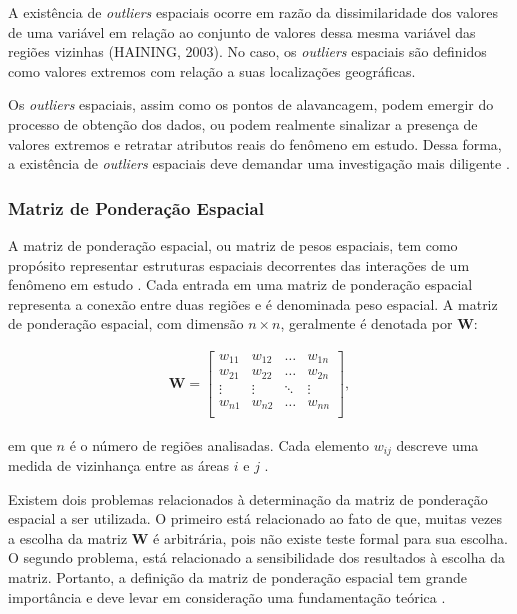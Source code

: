 \documentclass[12pt,a4paper]{article}
\begin{document}
A existência de \textit{outliers} espaciais ocorre em razão da dissimilaridade dos valores de uma variável em relação ao conjunto de valores dessa mesma variável das regiões vizinhas (HAINING, 2003). No caso, os \textit{outliers} espaciais são definidos como valores extremos com relação a suas localizações geográficas. 

Os \textit{outliers} espaciais, assim como os pontos de alavancagem, podem emergir do processo de obtenção dos dados, ou podem realmente sinalizar a presença de valores extremos e retratar atributos reais do fenômeno em estudo. Dessa forma, a existência de \textit{outliers} espaciais deve demandar uma investigação mais diligente \cite{almeida12_2}.
	
\subsubsection{Matriz de Ponderação Espacial} \label{W_matrix_2}
	
A matriz de ponderação espacial, ou matriz de pesos espaciais, tem como propósito representar estruturas espaciais decorrentes das interações de um fenômeno em estudo \cite{almeida12_2}.
Cada entrada em uma matriz de ponderação espacial representa a conexão entre duas regiões e é denominada peso espacial. A matriz de ponderação espacial, com dimensão $n \times n$, geralmente é denotada por $\boldsymbol{W}$: 
	
\begin{align*}
	\boldsymbol{W} =
    \left[
    \begin{array}{cccc}
        w_{11} & w_{12} & \dots & w_{1n} \\
        w_{21} & w_{22} & \dots &w_{2n} \\
        \vdots & \vdots & \ddots & \vdots \\
        w_{n1} & w_{n2} & \dots & w_{nn}\\
    \end{array}
    \right],
\end{align*}
	
\noindent em que $n$ é o número de regiões analisadas. Cada elemento $w_{ij}$ descreve uma medida de vizinhança entre as áreas $i$ e $j$ \cite{camara04}.
	
Existem dois problemas relacionados à determinação da matriz de ponderação espacial a ser utilizada. O primeiro está relacionado ao fato de que, muitas vezes a escolha da matriz $\boldsymbol{W}$ é arbitrária, pois não existe teste formal para sua escolha. O segundo problema, está relacionado a sensibilidade dos resultados à escolha da matriz. Portanto, a definição da matriz de ponderação espacial tem grande importância e deve levar em consideração uma fundamentação teórica \cite{almeida12_2}. 
	
\end{document}
